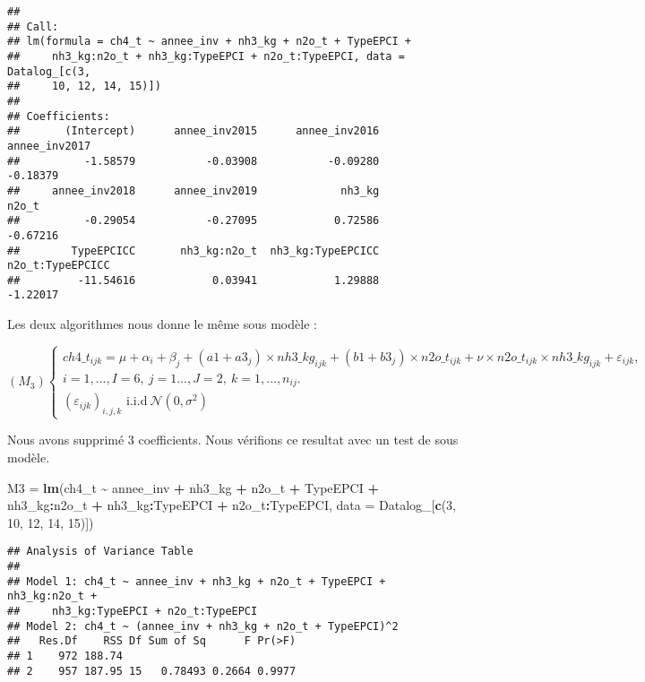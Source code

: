 \documentclass[
]{article}
\newenvironment{Shaded}{\begin{snugshade}}{\end{snugshade}}
\newcommand{\AttributeTok}[1]{\textcolor[rgb]{0.13,0.29,0.53}{#1}}
\newcommand{\DecValTok}[1]{\textcolor[rgb]{0.00,0.00,0.81}{#1}}
\newcommand{\FunctionTok}[1]{\textcolor[rgb]{0.13,0.29,0.53}{\textbf{#1}}}
\newcommand{\NormalTok}[1]{#1}
\newcommand{\OtherTok}[1]{\textcolor[rgb]{0.56,0.35,0.01}{#1}}
\newcommand{\SpecialCharTok}[1]{\textcolor[rgb]{0.81,0.36,0.00}{\textbf{#1}}}
\begin{document}
\begin{verbatim}
## 
## Call:
## lm(formula = ch4_t ~ annee_inv + nh3_kg + n2o_t + TypeEPCI + 
##     nh3_kg:n2o_t + nh3_kg:TypeEPCI + n2o_t:TypeEPCI, data = Datalog_[c(3, 
##     10, 12, 14, 15)])
## 
## Coefficients:
##       (Intercept)      annee_inv2015      annee_inv2016      annee_inv2017  
##          -1.58579           -0.03908           -0.09280           -0.18379  
##     annee_inv2018      annee_inv2019             nh3_kg              n2o_t  
##          -0.29054           -0.27095            0.72586           -0.67216  
##        TypeEPCICC       nh3_kg:n2o_t  nh3_kg:TypeEPCICC   n2o_t:TypeEPCICC  
##         -11.54616            0.03941            1.29888           -1.22017
\end{verbatim}

Les deux algorithmes nous donne le même sous modèle :

\[
(M_3) 
\left\{\begin{array}{l} ch4\_t_{ijk}= \mu + \alpha_i + \beta_j + (a1 + a3_j)\times nh3\_kg_{ijk} + (b1 + b3_j)\times n2o\_t_{ijk} + \nu \times n2o\_t_{ijk} \times nh3\_kg_{ijk} +
\varepsilon_{ijk},\ \\
i=1,\ldots,I=6,\ j=1 \ldots,J=2, \ k=1,\ldots,n_{ij}.\\ (\varepsilon_{ijk})_{i,j,k} \textrm{ i.i.d
} \ \mathcal{N}(0,\sigma^2) \end{array}\right. 
\]

Nous avons supprimé 3 coefficients. Nous vérifions ce resultat avec un
test de sous modèle.

\begin{Shaded}
\begin{Highlighting}[]
\NormalTok{M3 }\OtherTok{=} \FunctionTok{lm}\NormalTok{(ch4\_t }\SpecialCharTok{\textasciitilde{}}\NormalTok{ annee\_inv }\SpecialCharTok{+}\NormalTok{ nh3\_kg }\SpecialCharTok{+}\NormalTok{ n2o\_t }\SpecialCharTok{+}\NormalTok{ TypeEPCI }\SpecialCharTok{+} 
\NormalTok{    nh3\_kg}\SpecialCharTok{:}\NormalTok{n2o\_t }\SpecialCharTok{+}\NormalTok{ nh3\_kg}\SpecialCharTok{:}\NormalTok{TypeEPCI }\SpecialCharTok{+}\NormalTok{ n2o\_t}\SpecialCharTok{:}\NormalTok{TypeEPCI, }\AttributeTok{data =}\NormalTok{ Datalog\_[}\FunctionTok{c}\NormalTok{(}\DecValTok{3}\NormalTok{, }
    \DecValTok{10}\NormalTok{, }\DecValTok{12}\NormalTok{, }\DecValTok{14}\NormalTok{, }\DecValTok{15}\NormalTok{)])}
\end{Highlighting}
\end{Shaded}

\begin{verbatim}
## Analysis of Variance Table
## 
## Model 1: ch4_t ~ annee_inv + nh3_kg + n2o_t + TypeEPCI + nh3_kg:n2o_t + 
##     nh3_kg:TypeEPCI + n2o_t:TypeEPCI
## Model 2: ch4_t ~ (annee_inv + nh3_kg + n2o_t + TypeEPCI)^2
##   Res.Df    RSS Df Sum of Sq      F Pr(>F)
## 1    972 188.74                           
## 2    957 187.95 15   0.78493 0.2664 0.9977
\end{verbatim}
\end{document}
